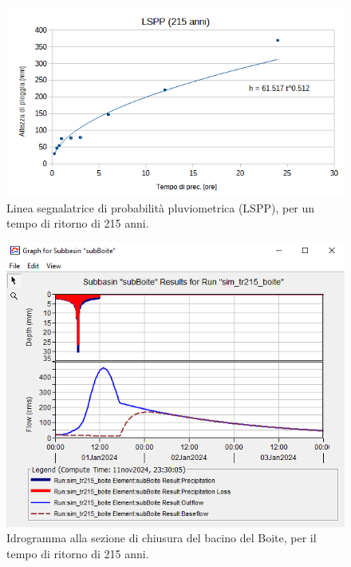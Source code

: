 \begin{figure}[H] \centering
\includegraphics[scale=0.6]{immagini/LSPP_215.png}
\caption{Linea segnalatrice di probabilità pluviometrica (LSPP), per un tempo di ritorno di 215 anni.}
\label{figure:LSPP_215}    
\end{figure}

\begin{figure}[H] \centering
\includegraphics[scale=0.6]{immagini/boite_215.PNG}
\caption{Idrogramma alla sezione di chiusura del bacino del Boite, per il tempo di ritorno di 215 anni.}
\label{figure:boite_215}    
\end{figure}

